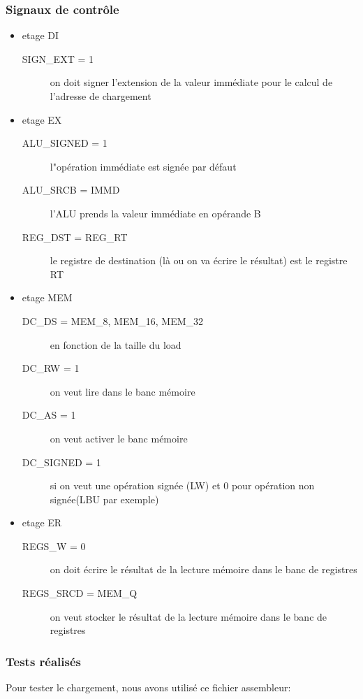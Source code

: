 \subsubsection{Signaux de contrôle}
\begin{itemize}
  \item etage DI
    \begin{description}
      \item[SIGN\_EXT = 1] on doit signer l'extension de la valeur immédiate pour le calcul de l'adresse de chargement
    \end{description}
  \item etage EX
    \begin{description}
       \item[ ALU\_SIGNED = 1] l"opération immédiate est signée par défaut
        \item[ALU\_SRCB = IMMD] l’ALU prends la valeur immédiate en opérande B
        \item[REG\_DST = REG\_RT] le registre de destination (là ou on va écrire le résultat) est le registre RT
    \end{description}
  \item etage MEM
    \begin{description}
      \item[DC\_DS = MEM\_8, MEM\_16, MEM\_32] en fonction de la taille du load
          \item[DC\_RW = 1]  on veut lire dans le banc mémoire
          \item[DC\_AS = 1] on veut activer le banc mémoire
          \item[DC\_SIGNED = 1] si on veut une opération signée (LW) et 0 pour opération non signée(LBU par exemple) 
    \end{description}
  \item etage ER
    \begin{description}
        \item[REGS\_W = 0] on doit écrire le résultat de la lecture mémoire dans le banc de registres
        \item[REGS\_SRCD = MEM\_Q] on veut stocker le résultat de la lecture mémoire dans le banc de registres
    \end{description}
\end{itemize}

\subsubsection{Tests réalisés}
Pour tester le chargement, nous avons utilisé ce fichier assembleur:

